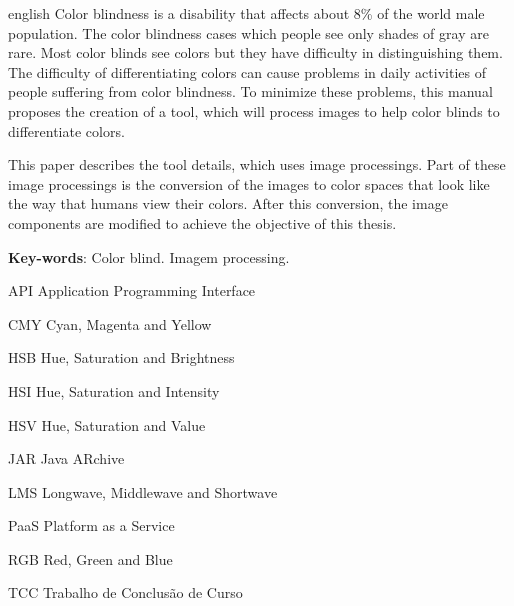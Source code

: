 \documentclass[	12pt, Times, openright, twoside, a4paper, english, brazil]{abntex2}
\begin{document}
\begin{resumo}[Abstract]
 \begin{otherlanguage*}{english}
Color blindness is a disability that affects about 8\% of the world male population. The color blindness cases which people see only shades of gray are rare. Most color blinds see colors but they have difficulty in distinguishing them. The difficulty of differentiating colors can cause problems in daily activities of people suffering from color blindness. To minimize these problems, this manual proposes the creation of a tool, which will process images to help color blinds to differentiate colors.

This paper describes the tool details, which uses image processings. Part of these image processings is the conversion of the images to color spaces that look like the way that humans view their colors. After this conversion, the image components are modified to achieve the objective of this thesis.

\vspace{\onelineskip}
 
   \noindent 
   \textbf{Key-words}: Color blind. Imagem processing.
 \end{otherlanguage*}
\end{resumo}

\listoffigures*
\cleardoublepage

\listoftables*
\cleardoublepage


\begin{siglas}
  \item[API] Application Programming Interface
  \item[CMY] Cyan, Magenta and Yellow
  \item[HSB] Hue, Saturation and Brightness
  \item[HSI] Hue, Saturation and Intensity
  \item[HSV] Hue, Saturation and Value
  \item[JAR] Java ARchive
  \item[LMS] Longwave, Middlewave and Shortwave
  \item[PaaS] Platform as a Service
  \item[RGB] Red, Green and Blue
  \item[TCC] Trabalho de Conclusão de Curso
  

\end{siglas}
\end{document}
